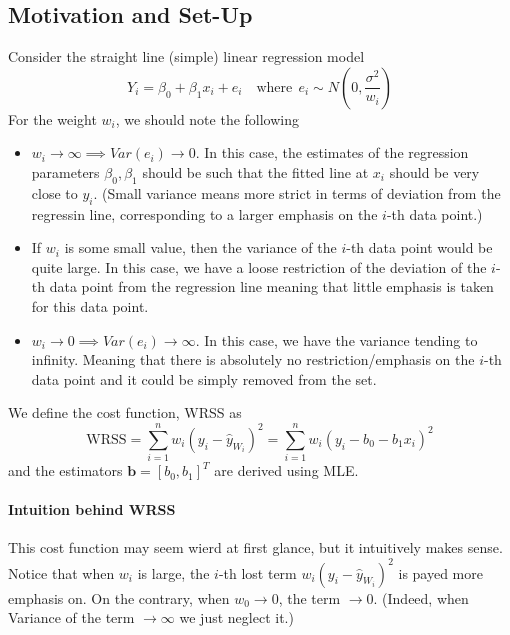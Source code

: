 \documentclass[11pt]{article}
\newcommand{\bb}{\mathbf{b}}
\begin{document}
\subsection{Motivation and Set-Up}
Consider the straight line (simple) linear regression model
\begin{equation*}
    Y_{i}=\beta_{0}+\beta_{1} x_{i}+e_{i} \quad \text{where}~~ e_i \sim N \left(0, \frac{\sigma^2}{w_i}\right)
\end{equation*}
For the weight $w_i$, we should note the following
\begin{itemize}
    \item $w_i \rightarrow \infty \implies Var(e_i) \rightarrow 0$. In this case, the estimates of the regression parameters $\beta_0, \beta_1$ should be such that the fitted line at $x_i$ should be very close to $y_i$. (Small variance means more strict in terms of deviation from the regressin line, corresponding to a larger emphasis on the $i$-th data point.)
    \item If $w_i$ is some small value, then the variance of the $i$-th data point would be quite large. In this case, we have a loose restriction of the deviation of the $i$-th data point from the regression line meaning that little emphasis is taken for this data point.
    \item $w_i \rightarrow 0 \implies Var(e_i) \rightarrow \infty$. In this case, we have the variance tending to infinity. Meaning that there is absolutely no restriction/emphasis on the $i$-th data point and it could be simply removed from the set.
\end{itemize}
We define the cost function, WRSS as
\begin{equation*}
    \mathrm{WRSS}=\sum_{i=1}^{n} w_{i}\left(y_{i}-\hat{y}_{W_i}\right)^{2}=\sum_{i=1}^{n} w_{i}\left(y_{i}-b_{0}-b_{1} x_{i}\right)^{2}
\end{equation*}
and the estimators $\bb = [b_0, b_1]^T$ are derived using MLE. 

\paragraph{Intuition behind WRSS} This cost function may seem wierd at first glance, but it intuitively makes sense. Notice that when $w_i$ is large, the $i$-th lost term $w_{i}\left(y_{i}-\hat{y}_{W_i}\right)^{2}$ is payed more emphasis on. On the contrary, when $w_0 \rightarrow 0$, the term $\rightarrow 0$. (Indeed, when Variance of the term $\rightarrow \infty$ we just neglect it.)
\end{document}
